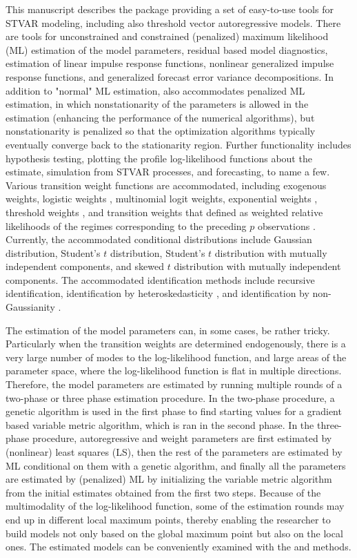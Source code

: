 \documentclass[nojss]{jss}
\begin{document}
This manuscript describes the  package  providing a set of easy-to-use tools for STVAR modeling, including also threshold vector autoregressive models. There are tools for unconstrained and constrained (penalized) maximum likelihood (ML) estimation of the model parameters, residual based model diagnostics, estimation of linear impulse response functions, nonlinear generalized impulse response functions, and generalized forecast error variance decompositions. In addition to "normal" ML estimation,  also accommodates penalized ML estimation, in which nonstationarity of the parameters is allowed in the estimation (enhancing the performance of the numerical algorithms), but nonstationarity is penalized so that the optimization algorithms typically eventually converge back to the stationarity region. Further functionality includes hypothesis testing, plotting the profile log-likelihood functions about the estimate, simulation from STVAR processes, and forecasting, to name a few. Various transition weight functions are accommodated, including exogenous weights, logistic weights \citep{Anderson+Vahid:1998}, multinomial logit weights, exponential weights \citep[e.g.,][]{Hubrich+Terasvirta:2013}, threshold weights \citep{Tsay:1998}, and transition weights that defined as weighted relative likelihoods of the regimes corresponding to the preceding $p$ observations \citep{Lanne+Virolainen:2024}. Currently, the accommodated conditional distributions include Gaussian distribution, Student's $t$ distribution, Student's $t$ distribution with mutually independent components, and skewed $t$ distribution with mutually independent components. The accommodated identification methods include recursive identification, identification by heteroskedasticity \citep{Lutkepohl+Netsunajev:2017}, and identification by non-Gaussianity \citep{Virolainen2:2024}.

The estimation of the model parameters can, in some cases, be rather tricky. Particularly when the transition weights are determined endogenously, there is a very large number of modes to the log-likelihood function, and large areas of the parameter space, where the log-likelihood function is flat in multiple directions. Therefore, the model parameters are estimated by running multiple rounds of a two-phase or three phase estimation procedure. In the two-phase procedure, a genetic algorithm is used in the first phase to find starting values for a gradient based variable metric algorithm, which is ran in the second phase. In the three-phase procedure, autoregressive and weight parameters are first estimated by (nonlinear) least squares (LS), then the rest of the parameters are estimated by ML conditional on them with a genetic algorithm, and finally all the parameters are estimated by (penalized) ML by initializing the variable metric algorithm from the initial estimates obtained from the first two steps. Because of the multimodality of the log-likelihood function, some of the estimation rounds may end up in different local maximum points, thereby enabling the researcher to build models not only based on the global maximum point but also on the local ones. The estimated models can be conveniently examined with the  and  methods.
\end{document}
